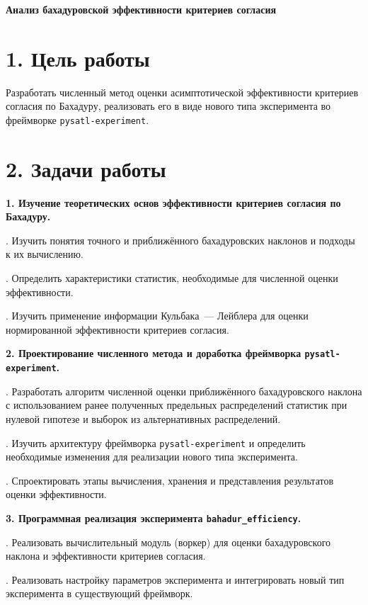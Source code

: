 \documentclass[12pt,a4paper]{article}
\begin{document}
\begin{center}
\textbf{\Large Анализ бахадуровской эффективности критериев согласия}
\end{center}

\section*{1. Цель работы}

Разработать численный метод оценки асимптотической эффективности критериев согласия по Бахадуру, реализовать его в виде нового типа эксперимента во фреймворке \texttt{pysatl-experiment}.

\section*{2. Задачи работы}

\noindent\textbf{1. Изучение теоретических основ эффективности критериев согласия по Бахадуру.}

. Изучить понятия точного и приближённого бахадуровских наклонов и подходы к их вычислению.

. Определить характеристики статистик, необходимые для численной оценки эффективности.

. Изучить применение информации Кульбака~--- Лейблера для оценки нормированной эффективности критериев согласия.

\medskip
\noindent\textbf{2. Проектирование численного метода и доработка фреймворка \texttt{pysatl-experiment}.}

. Разработать алгоритм численной оценки приближённого бахадуровского наклона с использованием ранее полученных предельных распределений статистик при нулевой гипотезе и выборок из альтернативных распределений.

. Изучить архитектуру фреймворка \texttt{pysatl-experiment} и определить необходимые изменения для реализации нового типа эксперимента.

. Спроектировать этапы вычисления, хранения и представления результатов оценки эффективности.

\medskip
\noindent\textbf{3. Программная реализация эксперимента \texttt{bahadur\_efficiency}.}

. Реализовать вычислительный модуль (воркер) для оценки бахадуровского наклона и эффективности критериев согласия.

. Реализовать настройку параметров эксперимента и интегрировать новый тип эксперимента в существующий фреймворк.
\end{document}
